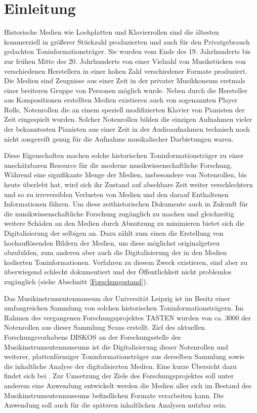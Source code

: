 \section{Einleitung}

Historische Medien wie Lochplatten und Klavierrollen sind die ältesten kommerziell in größerer Stückzahl produzierten und auch für den Privatgebrauch gedachten Toninformationsträger.
Sie wurden vom Ende des 19. Jahrhunderts bis zur frühen Mitte des 20. Jahrhunderts von einer Vielzahl von Musikstücken von verschiedenen Herstellern in einer hohen Zahl verschiedener Formate produziert.
Die Medien sind Zeugnisse aus einer Zeit in der privater Musikkonsum erstmals einer breiteren Gruppe von Personen möglich wurde.
Neben durch die Hersteller aus Kompositionen erstellten Medien existieren auch von sogenannten Player Rolls, Notenrollen die an einem speziell modifizierten Klavier von Pianisten der Zeit eingespielt wurden.
Solcher Notenrollen bilden die einzigen Aufnahmen vieler der bekanntesten Pianisten aus einer Zeit in der Audioaufnahmen technisch noch nicht ausgereift genug für die Aufnahme musikalischer Darbietungen waren.

Diese Eigenschaften machen solche historischen Toninformationsträger zu einer unschätzbaren Resource für die moderne musikwissenschaftliche Forschung.
Während eine signifikante Menge der Medien, insbesondere von Notenrollen, bis heute überlebt hat, wird sich ihr Zustand auf absehbare Zeit weiter verschlechtern und so zu irreversiblen Verlusten von Medien und den darauf Enthaltenen Informationen führen.
Um diese zeithistorischen Dokumente auch in Zukunft für die musikwissenschaftliche Forschung zugänglich zu machen und gleichzeitig weitere Schäden an den Medien durch Abnutzung zu minimieren bietet sich die Digitalisierung der selbigen an.
Dazu zählt zum einen die Erstellung von hochauflösenden Bildern der Medien, um diese möglichst originalgetreu abzubilden, zum anderen aber auch die Digitalisierung der in den Medien kodierten Toninformationen.
Verfahren zu diesem Zweck existieren, sind aber zu überwiegend schlecht dokumentiert und der Öffentlichkeit nicht problemlos zugänglich (siehe Abschnitt \ref{Forschungsstand}).

Das Musikinstrumentenmuseum der Universität Leipzig ist im Besitz einer umfangreichen Sammlung von solchen historischen Toninformationsträgern.
Im Rahmen des vergangenen Forschungsprojektes TASTEN wurden von ca. 3000 der Notenrollen aus dieser Sammlung Scans erstellt.
Ziel des aktuellen Forschungsvorhabens DISKOS an der Forschungsstelle des Musikinstrumentenmuseums ist die Digitalisierung dieser Notenrollen und weiterer, plattenförmiger Toninformationsträger aus derselben Sammlung sowie die inhaltliche Analyse der digitalisierten Medien.
Eine kurze Übersicht dazu findet sich bei \textcite[]{khulusi_2022}.
Zur Umsetzung der Ziele des Forschungsprojektes soll unter anderem eine Anwendung entwickelt werden die Medien aller sich im Bestand des Musikinstrumentenmuseums befindlichen Formate verarbeiten kann.
Die Anwendung soll auch für die späteren inhaltlichen Analysen nutzbar sein.

